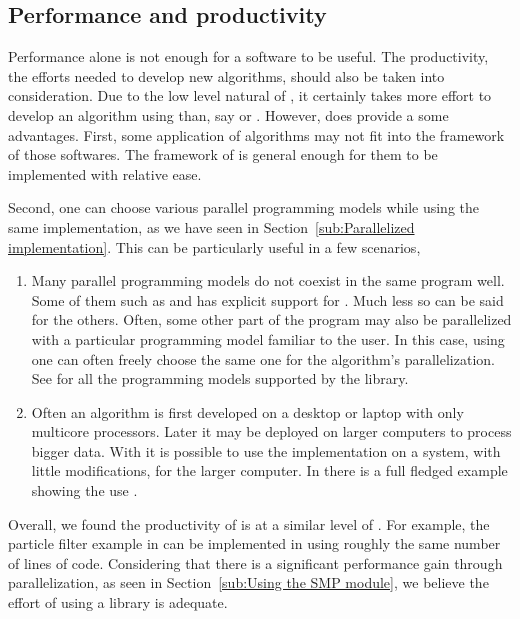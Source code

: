 \subsection{Performance and productivity}
\label{sub:Performance and productivity}

Performance alone is not enough for a software to be useful. The productivity, the efforts needed to develop new algorithms, should also be taken into consideration. Due to the low level natural of \cpp, it certainly takes more effort to develop an algorithm using \vsmc than, say \libbi or \biips. However, \smc does provide a some advantages. First, some application of \smc algorithms may not fit into the framework of those softwares. The framework of \smc is general enough for them to be implemented with relative ease.

Second, one can choose various parallel programming models while using the same implementation, as we have seen in Section~\ref{sub:Parallelized implementation}. This can be particularly useful in a few scenarios,
\begin{enumerate}
  \item Many parallel programming models do not coexist in the same program well. Some of them such as \tbb and \cilk has explicit support for \openmp. Much less so can be said for the others. Often, some other part of the program may also be parallelized with a particular programming model familiar to the user. In this case, using \vsmc one can often freely choose the same one for the \smc algorithm's parallelization. See \cite{vsmcjss} for all the programming models supported by the library.
  \item Often an algorithm is first developed on a desktop or laptop with only multicore processors. Later it may be deployed on larger computers to process bigger data. With \vsmc it is possible to use the implementation on a \smp system, with little modifications, for the larger computer. In \cite{vsmcjss} there is a full fledged example showing the use \mpi.
\end{enumerate}

Overall, we found the productivity of \vsmc is at a similar level of \smctc. For example, the particle filter example in \cite{smctc} can be implemented in \vsmc using roughly the same number of lines of code. Considering that there is a significant performance gain through parallelization, as seen in Section~\ref{sub:Using the SMP module}, we believe the effort of using a \cpp library is adequate.

